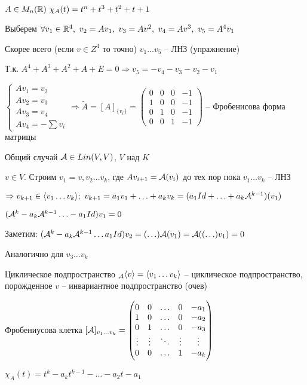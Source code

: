 \documentclass[12pt]{article}
\begin{document}
\begin{Example}{}
    $A \in M_n(\mathbb R)\ \chi_A(t) = t^n + t^3 + t^2 + t + 1$

    Выберем $\forall v_1 \in \mathbb R^4,\ v_2 = Av_1,\ v_3 = Av^2,\ v_4 = Av^3,\ v_5 = A^4v_1$

    Скорее всего (если $v \in Z^4$ то точно) $v_1 \ldots v_5$ -- ЛНЗ (упражнение)

    Т.к. $A^4 + A^3 + A^2 + A + E = 0 \Rightarrow v_5 = -v_4 - v_3 - v_2 - v_1$

    $\begin{cases}
        Av_1 = v_2 \\
        Av_2 = v_3 \\
        Av_3 = v_4 \\
        Av_4 = - \sum v_i
    \end{cases} \Rightarrow \tilde{A} = [A]_{\{v_i\}} = \begin{pmatrix}
        0 & 0 & 0 & - 1 \\
        1 & 0 & 0 & - 1 \\ 
        0 & 1 & 0 & - 1 \\
        0 & 0 & 1 & - 1
    \end{pmatrix}$ -- Фробенисова форма матрицы
\end{Example}

\begin{nota}{Общий случай}
    $\mathcal{A} \in Lin(V, V)$, $V$ над $K$

    $v \in V$. Строим $v_1 = v, v_2 \ldots v_k$, где $Av_{i + 1} = \mathcal{A}(v_i)$ до тех пор пока $v_1 \ldots v_k$ -- ЛНЗ

    $\Rightarrow v_{k + 1} \in \langle v_1 \ldots v_k \rangle;\ v_{k + 1} = a_1v_1 + \ldots + a_kv_k = (a_1 Id + \ldots + a_k \mathcal{A}^{k - 1})(v_1)$

    $(\mathcal{A}^k - a_k\mathcal{A}^{k - 1} \ldots - a_1Id)v_1 = 0$

    Заметим: $(\mathcal{A}^k - a_k\mathcal{A}^{k - 1} \ldots a_1Id)v_2 = (\ldots)\mathcal{A}(v_1) = \mathcal{A}((\ldots)v_1) = 0$

    Аналогично для $v_3 \ldots v_k$
\end{nota}

\begin{defin}{Циклическое подпространство}
    $_{\mathcal{A}}\langle v \rangle = \langle v_1 \ldots v_k \rangle$ -- циклическое подпространство, порожденное $v$ -- инвариантное подпространство (очев)
\end{defin}

\begin{defin}{Фробениусова клетка}
    $[\mathcal{A}]_{v_1 \ldots v_k} = \begin{pmatrix}
        0 & 0 & \ldots & 0 & -a_1 \\
        1 & 0 & \ldots & 0 & -a_2 \\
        0 & 1 & \ldots & 0 & -a_3 \\
        \vdots & \vdots & \ddots & \vdots & \vdots \\
        0 & 0 & \ldots & 1 & -a_k
    \end{pmatrix}$

    $\chi_A(t) = t^k - a_kt^{k - 1} - \ldots - a_2t - a_1$ 
\end{defin}
\end{document}
